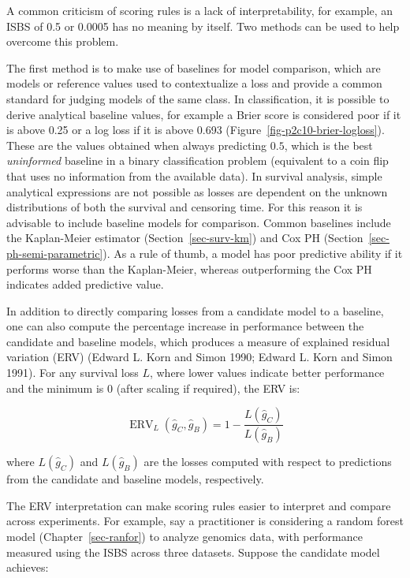 \documentclass[
  letterpaper,
  krantz2]{style/krantz}
\begin{document}
A common criticism of scoring rules is a lack of interpretability, for
example, an ISBS of 0.5 or 0.0005 has no meaning by itself. Two methods
can be used to help overcome this problem.

The first method is to make use of baselines for
model comparison, which are models or reference values used to
contextualize a loss and provide a common standard for judging models of
the same class. In classification, it is possible to derive analytical
baseline values, for example a Brier score is considered poor if it is
above 0.25 or a log loss if it is above 0.693
(Figure~\ref{fig-p2c10-brier-logloss}). These are the values obtained
when always predicting \(0.5\), which is the best \emph{uninformed}
baseline in a binary classification problem (equivalent to a coin flip
that uses no information from the available data). In survival analysis,
simple analytical expressions are not possible as losses are dependent
on the unknown distributions of both the survival and censoring time.
For this reason it is advisable to include baseline models for
comparison. Common baselines include the Kaplan-Meier estimator
(Section~\ref{sec-surv-km}) and Cox PH
(Section~\ref{sec-ph-semi-parametric}).
 As a rule
of thumb, a model has poor predictive ability if it performs worse than
the Kaplan-Meier, whereas outperforming the Cox PH indicates added
predictive value.

In addition to directly comparing losses from a candidate model to a
baseline, one can also compute the percentage increase in performance
between the candidate and baseline models, which produces a measure of
explained residual variation (ERV) (Edward L. Korn and Simon 1990;
Edward L. Korn and Simon 1991). For
any survival loss \(L\), where lower values indicate better performance
and the minimum is \(0\) (after scaling if required), the ERV is:

\[
\operatorname{ERV}_L(\hat{g}_C, \hat{g}_B) = 1 - \frac{L(\hat{g}_C)}{L(\hat{g}_B)}
\]

where \(L(\hat{g}_C)\) and \(L(\hat{g}_B)\) are the losses computed with
respect to predictions from the candidate and baseline models,
respectively.

The ERV interpretation can make scoring rules easier to interpret and
compare across experiments. For example, say a practitioner is
considering a random forest model (Chapter~\ref{sec-ranfor}) to analyze
genomics data, with performance measured using the ISBS across three
datasets. Suppose the candidate model achieves:
\end{document}
